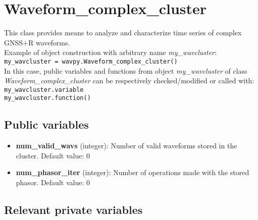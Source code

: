 \chapter{Waveform\_complex\_cluster}\label{cha:wavcom}

This class provides means to analyze and characterize time series of complex GNSS+R waveforms.\\

Example of object construction with arbitrary name {\it my\_wavcluster}:\\

\texttt{my\_wavcluster = wavpy.Waveform\_complex\_cluster()}\\

In this case, public variables and functions from object {\it my\_wavcluster} of class {\it Waveform\_complex\_cluster} can be respectively checked/modified or called with:\\

\texttt{my\_wavcluster.variable}\\

\texttt{my\_wavcluster.function()}\\


\section{Public variables}

\begin{itemize}
\item {\bf num\_valid\_wavs} (integer): Number of valid waveforms stored in the cluster. Default value: 0

\item {\bf num\_phasor\_iter} (integer): Number of operations made with the stored phasor. Default value: 0
\end{itemize}


\section{Relevant private variables}

